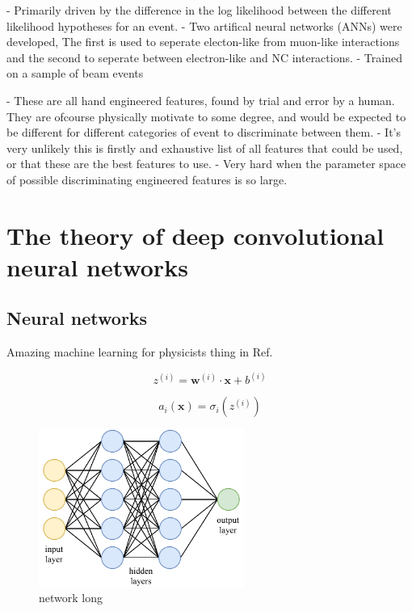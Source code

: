 - Primarily driven by the difference in the log likelihood between the different likelihood
hypotheses for an event.
- Two artifical neural networks (ANNs) were developed, The first is used to seperate electon-like
from muon-like interactions and the second to seperate between electron-like and NC interactions.
- Trained on a sample of beam events

- These are all hand engineered features, found by trial and error by a human. They are ofcourse
physically motivate to some degree, and would be expected to be different for different categories
of event to discriminate between them.
- It's very unlikely this is firstly and exhaustive list of all features that could be used, or
that these are the best features to use.
- Very hard when the parameter space of possible discriminating engineered features is so large.


\section{The theory of deep convolutional neural networks} %
\label{sec:cvn_theory} %

\subsection{Neural networks} %
\label{sec:cvn_theory_basic} %

Amazing machine learning for physicists thing in Ref.~\cite{mehta2019}

\begin{equation} %
    z^{(i)}=\boldsymbol{w}^{(i)}\cdot\boldsymbol{x}+b^{(i)}
\end{equation}

\begin{equation} %
    a_{i}(\boldsymbol{x})=\sigma_i(z^{(i)})
\end{equation}

\begin{figure} %
    \includegraphics[width=0.6\textwidth]{diagrams/7-cvn/network.pdf}
    \caption[network short]
    {network long}
    \label{fig:network}
\end{figure}

